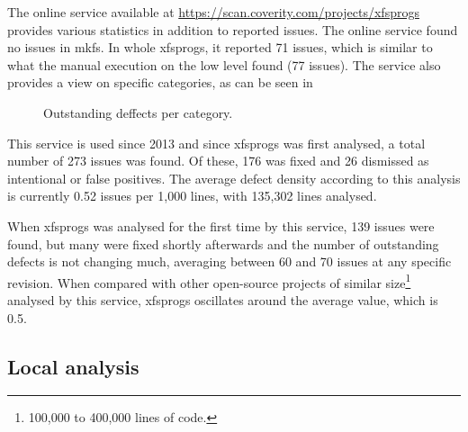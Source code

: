 The online service available at
\url{https://scan.coverity.com/projects/xfsprogs} provides various statistics
in addition to reported issues. The online service found no issues in mkfs. In
whole xfsprogs, it reported 71 issues, which is similar to what the manual
execution on the low level found (77 issues). The service also provides a view on
specific categories, as can be seen in 

\begin{figure}
\caption{Outstanding deffects per category.}
\label{fig:results:coverity:defects}
\end{figure}

This service is used since 2013 and since xfsprogs was first analysed, a total
number of 273 issues was found. Of these, 176 was fixed and 26 dismissed as
intentional or false positives. The average defect density according to this
analysis is currently 0.52 issues per 1,000 lines, with 135,302 lines analysed.

When xfsprogs was analysed for the first time by this service, 139 issues were
found, but many were fixed shortly afterwards and the number of outstanding
defects is not changing much, averaging between 60 and 70 issues at any
specific revision. When compared with other open-source projects of similar
size\footnote{100,000 to 400,000 lines of code.} analysed by this service,
xfsprogs oscillates around the average value, which is 0.5.

\subsection{Local analysis}\label{chap:results:coverity:local}


